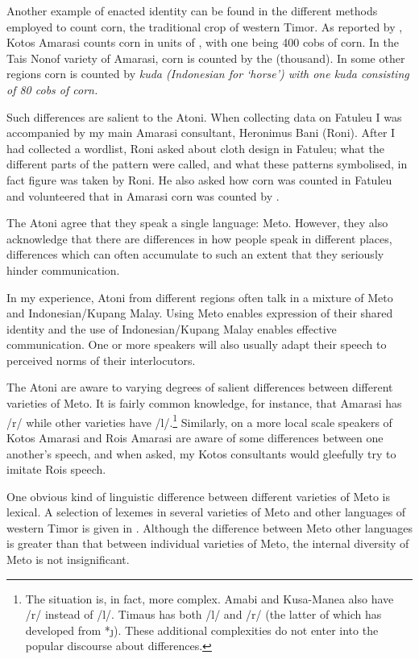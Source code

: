 Another example of enacted identity can be found in the 
different methods employed to count corn,
the traditional crop of western Timor.
As reported by \cite{grba11}, Kotos Amarasi counts
corn in units of , with one  being 400 cobs of corn.
In the Tais Nonof variety of Amarasi,
corn is counted by the  (thousand).
In some other regions corn is counted by \it{kuda} (Indonesian for `horse')
with one \it{kuda} consisting of 80 cobs of corn.

Such differences are salient to the Atoni.
When collecting data on Fatule{\Q}u I was accompanied
by my main Amarasi consultant, Heronimus Bani (Roni).
After I had collected a wordlist,
Roni asked about cloth design in Fatule{\Q}u;
what the different parts of the pattern were called,
and what these patterns symbolised, in fact
figure  was taken by Roni.
He also asked how corn was counted in Fatule{\Q}u
and volunteered that in Amarasi corn was counted by .

The Atoni agree that they speak a single language: Meto.
However, they also acknowledge that there are differences in how people speak
in different places, differences which can often accumulate to such an
extent that they seriously hinder communication.

In my experience, Atoni from different regions
often talk in a mixture of Meto and Indonesian/Kupang Malay.
Using Meto enables expression of their shared identity and
the use of Indonesian/Kupang Malay enables effective communication.
One or more speakers will also usually adapt their speech to
perceived norms of their interlocutors.

The Atoni are aware to varying degrees of salient differences between different varieties of Meto.
It is fairly common knowledge, for instance, that Amarasi has /r/ while
other varieties have /l/.\footnote{
		The situation is, in fact, more complex.
		Amabi and Kusa-Manea also have /r/ instead of /l/.
		Timaus has both /l/ and /r/
		(the latter of which has developed from *\j).
		These additional complexities do not enter into the
		popular discourse about differences.}
Similarly, on a more local scale speakers of Kotos Amarasi and Ro{\Q}is Amarasi
are aware of some differences between one another's speech,
and when asked, my Kotos consultants would gleefully try to imitate Ro{\Q}is speech.

One obvious kind of linguistic difference between
different varieties of Meto is lexical.
A selection of lexemes in several varieties of Meto
and other languages of western Timor is given in .
Although the difference between Meto other languages
is greater than that between individual varieties of Meto,
the internal diversity of Meto is not insignificant.


